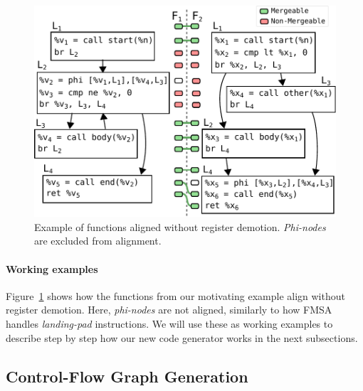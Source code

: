 \begin{figure}[t!]
  \centering
  \includegraphics[scale=0.75]{src/merge-operation/figs/code-gen-cfg-input.pdf}
    \caption{Example of functions aligned without register demotion.
    \textit{Phi-nodes} are excluded from alignment.}
  \label{fig:code-gen-cfg-input}
\end{figure}

\paragraph*{Working examples} Figure~\ref{fig:code-gen-cfg-input} shows how the functions from our motivating example align without register demotion.
Here, \textit{phi-nodes} are not aligned, similarly to how FMSA handles \textit{landing-pad} instructions. We will use these as working
examples to describe step by step how our new code generator works in the next subsections.

\subsection{Control-Flow Graph Generation} \label{sec:code-gen-core}

